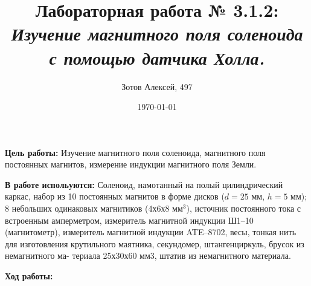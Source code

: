 \documentclass[10pt]{article}
\title{Лабораторная работа № 3.1.2: {\it Изучение магнитного поля соленоида с помощью датчика Холла.}}
\author{Зотов Алексей, 497}
\date{\today}
\begin{document}
\maketitle
\textbf{Цель работы:} Изучение магнитного поля соленоида, магнитного поля постоянных магнитов, измерение индукции магнитного поля Земли.

\textbf{В работе испольуются:} \small{Соленоид, намотанный на полый цилиндрический каркас, набор из 10 постоянных магнитов в форме дисков ($d = 25$ мм, $h = 5$ мм); 8 небольших одинаковых магнитиков (4х6х8 $\text{мм}^3$), источник постоянного тока с встроенным амперметром, измеритель магнитной индукции Ш1–10 (магнитометр), измеритель магнитной индукции ATE–8702, весы, тонкая нить для изготовления крутильного маятника, секундомер, штангенциркуль, брусок из немагнитного ма- териала 25х30х60 мм3, штатив из немагнитного материала.}

\textbf{Ход работы:}
\end{document}
